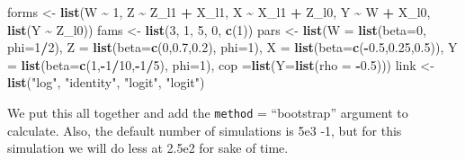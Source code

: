 \documentclass[
]{article}
\newenvironment{Shaded}{\begin{snugshade}}{\end{snugshade}}
\newcommand{\AttributeTok}[1]{\textcolor[rgb]{0.13,0.29,0.53}{#1}}
\newcommand{\DecValTok}[1]{\textcolor[rgb]{0.00,0.00,0.81}{#1}}
\newcommand{\FloatTok}[1]{\textcolor[rgb]{0.00,0.00,0.81}{#1}}
\newcommand{\FunctionTok}[1]{\textcolor[rgb]{0.13,0.29,0.53}{\textbf{#1}}}
\newcommand{\NormalTok}[1]{#1}
\newcommand{\OtherTok}[1]{\textcolor[rgb]{0.56,0.35,0.01}{#1}}
\newcommand{\SpecialCharTok}[1]{\textcolor[rgb]{0.81,0.36,0.00}{\textbf{#1}}}
\newcommand{\StringTok}[1]{\textcolor[rgb]{0.31,0.60,0.02}{#1}}
\begin{document}
\begin{Shaded}
\begin{Highlighting}[]
\NormalTok{forms }\OtherTok{\textless{}{-}} \FunctionTok{list}\NormalTok{(W }\SpecialCharTok{\textasciitilde{}} \DecValTok{1}\NormalTok{,}
\NormalTok{              Z }\SpecialCharTok{\textasciitilde{}}\NormalTok{ Z\_l1 }\SpecialCharTok{+}\NormalTok{ X\_l1,}
\NormalTok{              X }\SpecialCharTok{\textasciitilde{}}\NormalTok{ X\_l1 }\SpecialCharTok{+}\NormalTok{ Z\_l0,}
\NormalTok{              Y }\SpecialCharTok{\textasciitilde{}}\NormalTok{ W }\SpecialCharTok{+}\NormalTok{ X\_l0,}
              \FunctionTok{list}\NormalTok{(Y }\SpecialCharTok{\textasciitilde{}}\NormalTok{ Z\_l0))}
\NormalTok{fams }\OtherTok{\textless{}{-}} \FunctionTok{list}\NormalTok{(}\DecValTok{3}\NormalTok{, }\DecValTok{1}\NormalTok{, }\DecValTok{5}\NormalTok{, }\DecValTok{0}\NormalTok{, }\FunctionTok{c}\NormalTok{(}\DecValTok{1}\NormalTok{))}
\NormalTok{pars }\OtherTok{\textless{}{-}} \FunctionTok{list}\NormalTok{(}\AttributeTok{W =} \FunctionTok{list}\NormalTok{(}\AttributeTok{beta=}\DecValTok{0}\NormalTok{, }\AttributeTok{phi=}\DecValTok{1}\SpecialCharTok{/}\DecValTok{2}\NormalTok{),}
             \AttributeTok{Z =} \FunctionTok{list}\NormalTok{(}\AttributeTok{beta=}\FunctionTok{c}\NormalTok{(}\DecValTok{0}\NormalTok{,}\FloatTok{0.7}\NormalTok{,}\FloatTok{0.2}\NormalTok{), }\AttributeTok{phi=}\DecValTok{1}\NormalTok{),}
             \AttributeTok{X =} \FunctionTok{list}\NormalTok{(}\AttributeTok{beta=}\FunctionTok{c}\NormalTok{(}\SpecialCharTok{{-}}\FloatTok{0.5}\NormalTok{,}\FloatTok{0.25}\NormalTok{,}\FloatTok{0.5}\NormalTok{)),}
             \AttributeTok{Y =} \FunctionTok{list}\NormalTok{(}\AttributeTok{beta=}\FunctionTok{c}\NormalTok{(}\DecValTok{1}\NormalTok{,}\SpecialCharTok{{-}}\DecValTok{1}\SpecialCharTok{/}\DecValTok{10}\NormalTok{,}\SpecialCharTok{{-}}\DecValTok{1}\SpecialCharTok{/}\DecValTok{5}\NormalTok{), }\AttributeTok{phi=}\DecValTok{1}\NormalTok{),}
             \AttributeTok{cop =}\FunctionTok{list}\NormalTok{(}\AttributeTok{Y=}\FunctionTok{list}\NormalTok{(}\AttributeTok{rho =} \SpecialCharTok{{-}}\FloatTok{0.5}\NormalTok{)))}
\NormalTok{link }\OtherTok{\textless{}{-}} \FunctionTok{list}\NormalTok{(}\StringTok{"log"}\NormalTok{, }\StringTok{"identity"}\NormalTok{, }\StringTok{"logit"}\NormalTok{, }\StringTok{"logit"}\NormalTok{)}
\end{Highlighting}
\end{Shaded}

We put this all together and add the \texttt{method} = ``bootstrap''
argument to calculate. Also, the default number of simulations is 5e3
-1, but for this simulation we will do less at 2.5e2 for sake of time.
\end{document}
